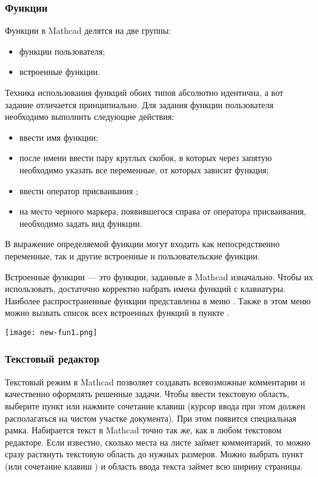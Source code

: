 \subsubsection*{Функции}
Функции в Mathcad делятся на две группы:
\begin{itemize}
\item функции пользователя;
\item встроенные функции.
\end{itemize}
Техника использования функций обоих типов абсолютно идентична, а вот задание отличается принципиально. Для задания функции пользователя необходимо выполнить следующие действия:
\begin{itemize}
	\item ввести имя функции;
	\item после имени ввести пару круглых скобок, в которых через запятую необходимо указать все переменные, от которых зависит функция;
	\item ввести оператор присваивания \mc{:=};
	\item на место черного маркера, появившегося справа от оператора присваивания, необходимо задать вид функции.
\end{itemize}

В выражение определяемой функции могут входить как непосредственно переменные, так и другие встроенные и пользовательские функции. 

Встроенные функции --- это функции, заданные в Mathcad изначально. Чтобы их использовать, достаточно корректно набрать имена функций с клавиатуры. Наиболее распространенные функции представлены в меню . Также в этом меню можно вызвать список всех встроенных функций в пункте  .
\begin{center}
	\texttt{[image: new-fun1.png]}
\end{center}


\subsubsection*{Текстовый редактор}

Текстовый режим в Mathcad позволяет создавать всевозможные комментарии и качественно оформлять решенные задачи.
Чтобы ввести текстовую область, выберите пункт  или  нажмите сочетание клавиш  (курсор ввода при этом должен располагаться на чистом участке документа). При этом появится специальная рамка.
Набирается текст в Mathcad точно так же, как в любом текстовом редакторе. Если известно, сколько места на листе займет комментарий, то можно сразу растянуть текстовую область до нужных размеров. Можно выбрать пункт   (или сочетание клавиш  ) и область ввода текста займет всю ширину страницы.

